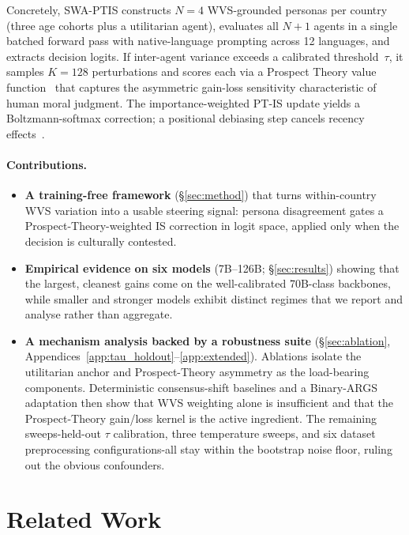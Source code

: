 \documentclass{article}
\begin{document}
Concretely, SWA-PTIS constructs $N=4$ WVS-grounded personas per country (three
age cohorts plus a utilitarian agent), evaluates all $N+1$ agents in a single batched
forward pass with native-language prompting across 12 languages, and extracts
decision logits. If inter-agent variance exceeds a calibrated threshold~$\tau$, it
samples $K=128$ perturbations and scores each via a Prospect Theory value
function~\citep{kahneman1979prospect} that captures the asymmetric gain-loss
sensitivity characteristic of human moral judgment. The importance-weighted PT-IS
update yields a Boltzmann-softmax correction; a positional debiasing step cancels recency
effects~\citep{liu2024lost}.

\paragraph{Contributions.}
\begin{itemize}
  \item \textbf{A training-free framework} (\S\ref{sec:method}) that turns
        within-country WVS variation into a usable steering signal: persona
        disagreement gates a Prospect-Theory-weighted IS correction in logit
        space, applied only when the decision is culturally contested.
  \item \textbf{Empirical evidence on six models} (7B--126B; \S\ref{sec:results})
        showing that the largest, cleanest gains come on the well-calibrated
        70B-class backbones, while smaller and stronger models exhibit distinct
        regimes that we report and analyse rather than aggregate.
  \item \textbf{A mechanism analysis backed by a robustness suite}
        (\S\ref{sec:ablation}, Appendices~\ref{app:tau_holdout}--\ref{app:extended}).
        Ablations isolate the utilitarian anchor and Prospect-Theory asymmetry
        as the load-bearing components. Deterministic consensus-shift
        baselines and a Binary-ARGS adaptation then show that WVS weighting
        alone is insufficient and that the Prospect-Theory gain/loss kernel is
        the active ingredient. The remaining sweeps-held-out $\tau$
        calibration, three temperature sweeps, and six dataset preprocessing
        configurations-all stay within the bootstrap noise floor, ruling out
        the obvious confounders.
\end{itemize}

\section{Related Work}
\label{sec:related}
\end{document}
